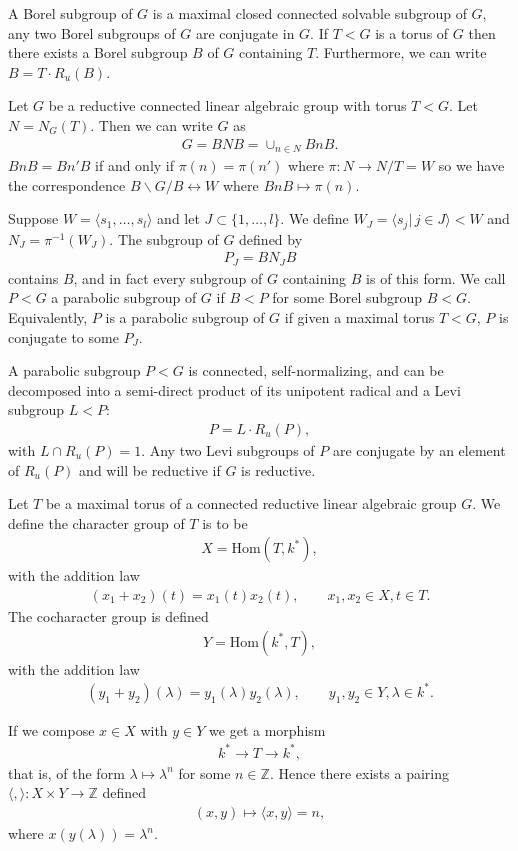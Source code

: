 A Borel subgroup of $G$ is a maximal closed connected solvable subgroup of $G$, any two Borel subgroups of $G$ are conjugate in $G$. If $T < G$ is a torus of $G$ then there exists a Borel subgroup $B$ of $G$ containing $T$. Furthermore, we can write $B = T\cdot R_u(B)$.

Let $G$ be a reductive connected linear algebraic group with torus $T < G$. Let $N = N_G(T)$. Then we can write $G$ as
\begin{align}
	G = BNB = \cup_{n\in N}BnB.
\end{align}
$BnB = Bn'B$ if and only if $\pi(n)=\pi(n')$ where $\pi:N\rightarrow N/T = W$ so we have the correspondence $B\backslash G/B \leftrightarrow W$ where $BnB \mapsto \pi(n)$.

Suppose $W = \langle s_1, \ldots, s_l\rangle$ and let $J \subset \{1, \ldots, l\}$. We define $W_J = \langle s_j |\, j\in J\rangle < W$ and $N_J = \pi^{-1}(W_J)$. The subgroup of $G$ defined by
\begin{align}
	P_J = BN_JB
\end{align}
contains $B$, and in fact every subgroup of $G$ containing $B$ is of this form. We call $P<G$ a parabolic subgroup of $G$ if $B<P$ for some Borel subgroup $B<G$. Equivalently, $P$ is a parabolic subgroup of $G$ if given a maximal torus $T<G$, $P$ is conjugate to some $P_J$. 

A parabolic subgroup $P<G$ is connected, self-normalizing, and can be decomposed into a semi-direct product of its unipotent radical and a Levi subgroup $L<P$:
\begin{align}
	P = L\cdot R_u(P),
\end{align}
with $L\cap R_u(P) = 1$. Any two Levi subgroups of $P$ are conjugate by an element of $R_u(P)$ and will be reductive if $G$ is reductive.

Let $T$ be a maximal torus of a connected reductive linear algebraic group $G$. We define the character group of $T$ is to be 
\begin{align}
	X = \textrm{Hom}(T, k^*),
\end{align}
with the addition law
\begin{align}
	(x_1 + x_2)(t) = x_1(t)x_2(t),\qquad x_1, x_2\in X, t\in T.
\end{align}
The cocharacter group is defined
\begin{align}
	Y = \textrm{Hom}(k^*, T),
\end{align}
with the addition law
\begin{align}
	(y_1 + y_2)(\lambda) = y_1(\lambda)y_2(\lambda),\qquad y_1, y_2\in Y, \lambda \in k^*.
\end{align}

If we compose $x\in X$ with $y\in Y$ we get a morphism
\begin{align}
	k^*\rightarrow T \rightarrow k^*,
\end{align}
that is, of the form $\lambda\mapsto \lambda^n$ for some $n\in \mathbb{Z}$. Hence there exists a pairing $\langle,\rangle:X\times Y\rightarrow \mathbb{Z}$ defined
\begin{align}
	(x, y) \mapsto \langle x, y\rangle = n,
\end{align}
where $x(y(\lambda)) = \lambda^n$. 
